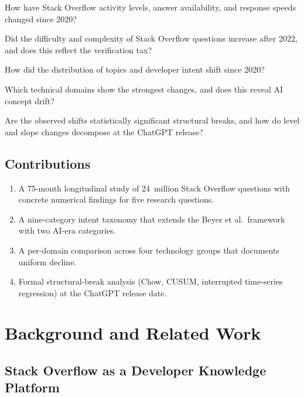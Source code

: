 \documentclass[sigconf]{acmart}
\begin{document}
\begin{description}[leftmargin=*,labelwidth=2.2em]
  \item[RQ1] How have Stack Overflow activity levels,
    answer availability, and response speeds
    changed since 2020?
  \item[RQ2] Did the difficulty and complexity
    of Stack Overflow questions increase after 2022,
    and does this reflect the verification tax?
  \item[RQ3] How did the distribution
    of topics and developer intent shift since 2020?
  \item[RQ4] Which technical domains show
    the strongest changes, and does this
    reveal AI concept drift?
  \item[RQ5] Are the observed shifts
    statistically significant structural breaks,
    and how do level and slope changes decompose
    at the ChatGPT release?
\end{description}

\subsection{Contributions}

\begin{enumerate}[leftmargin=*]
  \item A 75-month longitudinal study
    of \num{24}~million Stack Overflow questions
    with concrete numerical findings
    for five research questions.
  \item A nine-category intent taxonomy
    that extends the Beyer et
    al.\ framework~\cite{beyer2020kind}
    with two AI-era categories.
  \item A per-domain comparison
    across four technology groups
    that documents uniform decline.
  \item Formal structural-break analysis
    (Chow, CUSUM, interrupted time-series regression)
    at the ChatGPT release date.
\end{enumerate}

\section{Background and Related Work}
\label{sec:background}

\subsection{Stack Overflow as a Developer
Knowledge Platform}
\end{document}

